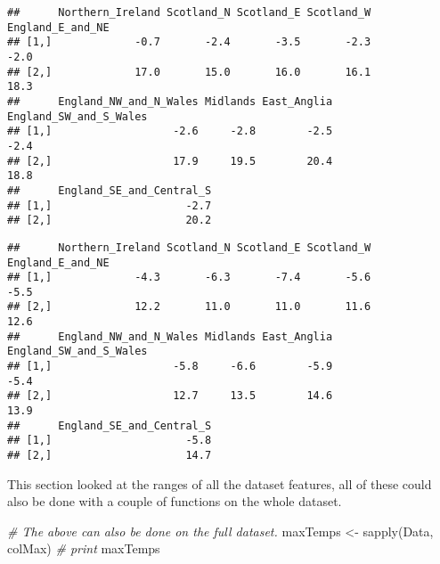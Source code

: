 \documentclass[
]{article}
\newenvironment{Shaded}{\begin{snugshade}}{\end{snugshade}}
\newcommand{\CommentTok}[1]{\textcolor[rgb]{0.56,0.35,0.01}{\textit{#1}}}
\newcommand{\FunctionTok}[1]{\textcolor[rgb]{0.00,0.00,0.00}{#1}}
\newcommand{\NormalTok}[1]{#1}
\newcommand{\OtherTok}[1]{\textcolor[rgb]{0.56,0.35,0.01}{#1}}
\newcommand{\SpecialCharTok}[1]{\textcolor[rgb]{0.00,0.00,0.00}{#1}}
\begin{document}
\begin{Shaded}
\end{Shaded}

\begin{verbatim}
##      Northern_Ireland Scotland_N Scotland_E Scotland_W England_E_and_NE
## [1,]             -0.7       -2.4       -3.5       -2.3             -2.0
## [2,]             17.0       15.0       16.0       16.1             18.3
##      England_NW_and_N_Wales Midlands East_Anglia England_SW_and_S_Wales
## [1,]                   -2.6     -2.8        -2.5                   -2.4
## [2,]                   17.9     19.5        20.4                   18.8
##      England_SE_and_Central_S
## [1,]                     -2.7
## [2,]                     20.2
\end{verbatim}

\begin{Shaded}
\end{Shaded}

\begin{verbatim}
##      Northern_Ireland Scotland_N Scotland_E Scotland_W England_E_and_NE
## [1,]             -4.3       -6.3       -7.4       -5.6             -5.5
## [2,]             12.2       11.0       11.0       11.6             12.6
##      England_NW_and_N_Wales Midlands East_Anglia England_SW_and_S_Wales
## [1,]                   -5.8     -6.6        -5.9                   -5.4
## [2,]                   12.7     13.5        14.6                   13.9
##      England_SE_and_Central_S
## [1,]                     -5.8
## [2,]                     14.7
\end{verbatim}

This section looked at the ranges of all the dataset features, all of
these could also be done with a couple of functions on the whole
dataset.

\begin{Shaded}
\begin{Highlighting}[]
\CommentTok{\# The above can also be done on the full dataset.}
\NormalTok{maxTemps }\OtherTok{\textless{}{-}} \FunctionTok{sapply}\NormalTok{(Data, colMax)}
\CommentTok{\# print}
\NormalTok{maxTemps}
\end{Highlighting}
\end{Shaded}
\end{document}
